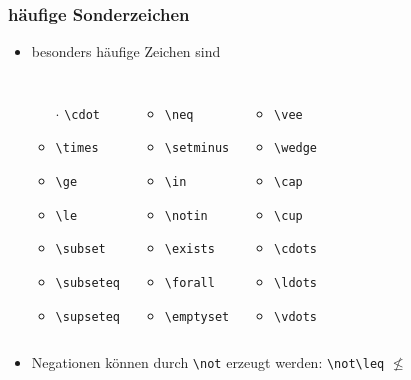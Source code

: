 \begin{frame}[fragile]
\frametitle{häufige Sonderzeichen}
\begin{itemize}
  \item besonders häufige Zeichen sind
  \begin{columns}
  \begin{itemize}
    \item[$\cdot$] \lstinline[style=Latex]+\cdot+
    \item[$\times$] \lstinline[style=Latex]+\times+
    \item[$\geq$] \lstinline[style=Latex]+\ge+
    \item[$\leq$] \lstinline[style=Latex]+\le+
    \item[$\subset$] \lstinline[style=Latex]+\subset+
    \item[$\subseteq$] \lstinline[style=Latex]+\subseteq+
    \item[$\supseteq$] \lstinline[style=Latex]+\supseteq+
  \end{itemize}
  \begin{itemize}
    \item[$\neq$] \lstinline[style=Latex]+\neq+
    \item[$\setminus$] \lstinline[style=Latex]+\setminus+
    \item[$\in$] \lstinline[style=Latex]+\in+
    \item[$\notin$] \lstinline[style=Latex]+\notin+
    \item[$\exists$] \lstinline[style=Latex]+\exists+
    \item[$\forall$] \lstinline[style=Latex]+\forall+
    \item[$\emptyset$] \lstinline[style=Latex]+\emptyset+
  \end{itemize}
  \begin{itemize}  
    \item[$\vee$] \lstinline[style=Latex]+\vee+
    \item[$\wedge$] \lstinline[style=Latex]+\wedge+
    \item[$\cap$] \lstinline[style=Latex]+\cap+
    \item[$\cup$] \lstinline[style=Latex]+\cup+
    \item[$\cdots$] \lstinline[style=Latex]+\cdots+
    \item[$\ldots$] \lstinline[style=Latex]+\ldots+
    \item[$\vdots$] \lstinline[style=Latex]+\vdots+
  \end{itemize}
\end{columns} \pause
\item Negationen können durch \lstinline[style=Latex]+\not+ erzeugt werden: \lstinline[style=Latex]+\not\leq+ $\not\leq$
\end{itemize}
\end{frame}

